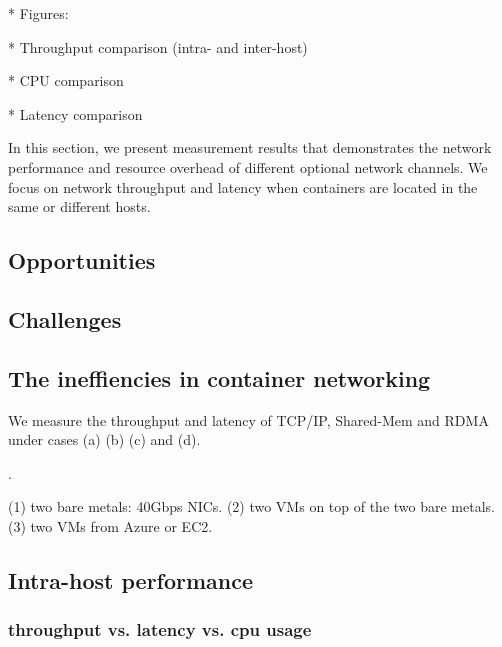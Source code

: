 \iffalse

* Figures:

* Throughput comparison (intra- and inter-host)

* CPU comparison

* Latency comparison

In this section, we present measurement results that demonstrates the network performance and resource overhead of different optional network channels. We focus on network throughput and latency when containers are located in the same or different hosts. 




\subsection{Opportunities}

\subsection{Challenges}

\subsection{The ineffiencies in container networking}

We measure the throughput and latency of TCP/IP, Shared-Mem and RDMA under cases
(a) (b) (c) and (d).

.

(1) two bare metals: 40Gbps NICs.
(2) two VMs on top of the two bare metals.
(3) two VMs from Azure or EC2.

\subsection{Intra-host performance}
\subsubsection{throughput vs. latency vs. cpu usage}

